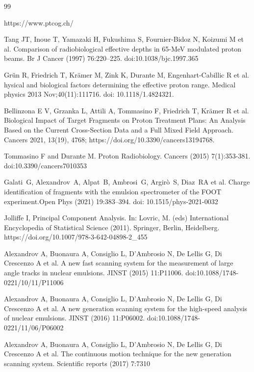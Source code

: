 \documentclass[utf8]{frontiersFPHY} %
\begin{document}
\begin{thebibliography}{99}

 https://www.ptcog.ch/

 Tang JT, Inoue T, Yamazaki H, Fukushima S, Fournier-Bidoz N, Koizumi M et al. Comparison of radiobiological effective depths in 65-MeV modulated proton beams. Br J Cancer (1997) 76:220–225. doi:10.1038/bjc.1997.365

 Gr{\"u}n R, Friedrich T, Kr{\"a}mer M, Zink K, Durante M, Engenhart-Cabillic R et al. hysical and biological factors determining the effective proton range. Medical physics 2013 Nov;40(11):111716. doi: 10.1118/1.4824321. 

 Bellinzona E V, Grzanka L, Attili A, Tommasino F, Friedrich T, Kr\"{a}mer R et al. Biological Impact of Target Fragments on Proton Treatment Plans: An Analysis Based on the Current Cross-Section Data and a Full Mixed Field Approach.  Cancers 2021, 13(19), 4768; https://doi.org/10.3390/cancers13194768. 

 Tommasino F and Durante M. Proton Radiobiology. Cancers (2015) 7(1):353-381. doi:10.3390/cancers7010353

 Galati~G, Alexandrov~A, Alpat~B, Ambrosi~G, Argirò~S, Diaz~RA et al. Charge identification of fragments with the emulsion spectrometer of the FOOT experiment.Open Phys (2021) 19:383–394. doi: 10.1515/phys-2021-0032

 Jolliffe I, Principal Component Analysis.  In: Lovric, M. (eds) International Encyclopedia of Statistical Science (2011). Springer, Berlin, Heidelberg. https://doi.org/10.1007/978-3-642-04898-2\_455

 Alexandrov A, Buonaura A, Consiglio L, D'Ambrosio N, De Lellis G, Di Crescenzo A et al. A new fast scanning system for the measurement of large angle tracks in nuclear emulsions. JINST (2015) 11:P11006. doi:10.1088/1748-0221/10/11/P11006

  Alexandrov A, Buonaura A, Consiglio L, D'Ambrosio N, De Lellis G, Di Crescenzo A et al. A new generation scanning system for the high-speed analysis of nuclear emulsions. JINST (2016) 11:P06002. doi:10.1088/1748-0221/11/06/P06002

 Alexandrov A, Buonaura A, Consiglio L, D'Ambrosio N, De Lellis G, Di Crescenzo A et al. The continuous motion technique  for the new generation scanning system. Scientific reports (2017) 7:7310


\end{thebibliography}
\end{document}
